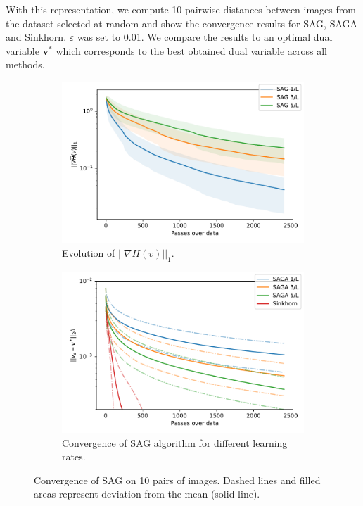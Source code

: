 With this representation, we compute 10 pairwise distances between images from the dataset selected at random and show the convergence results for SAG, SAGA and Sinkhorn. $\varepsilon$ was set to 0.01. We compare the results to an optimal dual variable $\bm{v}^*$ which corresponds to the best obtained dual variable across all methods.

\begin{figure}[h]
    \begin{subfigure}{.49\linewidth}
        \centering
        \includegraphics[width=\linewidth]{figures/sag_image_retreival_avg.pdf}
        \caption{Evolution of $||\nabla\overline{H}(v)||_1$.}
    \end{subfigure}
    \begin{subfigure}{.49\linewidth}
        \centering
        \includegraphics[width=\linewidth]{figures/sag_image_retreival_vs_avg.pdf}
        \caption{Convergence of SAG algorithm for different learning rates.}
    \end{subfigure}
    \caption{Convergence of SAG on 10 pairs of images. Dashed lines and filled areas represent deviation from the mean (solid line).}
\end{figure}

